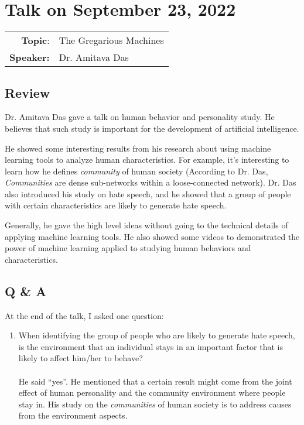 \documentclass[11pt, oneside]{article}   	%
\begin{document}
\newpage
\section{Talk on September 23, 2022}
\begin{tabularx} {\textwidth}{r X}
\textbf{Topic}: & The Gregarious Machines\\
\textbf{Speaker:} & Dr. Amitava Das\\
\end{tabularx}

\subsection{Review}
Dr. Amitava Das gave a talk on human behavior and personality study. He believes that such study is important for the development of artificial intelligence. 

He showed some interesting results from his research about using machine learning tools to analyze human characteristics. For example, it's interesting to learn how he defines \textit{community} of human society (According to Dr. Das, \emph{Communities} are dense sub-networks within a loose-connected network). Dr. Das also introduced his study on hate speech, and he showed that a group of people with certain characteristics are likely to generate hate speech. 

Generally, he gave the high level ideas without going to the technical details of applying machine learning tools. He also showed some videos to demonstrated the power of machine learning applied to studying human behaviors and characteristics.

\subsection{Q \& A}
At the end of the talk, I asked one question: 
\begin{enumerate}
\item When identifying the group of people who are likely to generate hate speech, is the environment that an individual stays in an important factor that is likely to affect him/her to behave? \\ \\
He said ``yes''. He mentioned that a certain result might come from the joint effect of human personality and the community environment where people stay in. His study on the \textit{communities} of human society is to address causes from the environment aspects. 
\end{enumerate}
 
\end{document}
